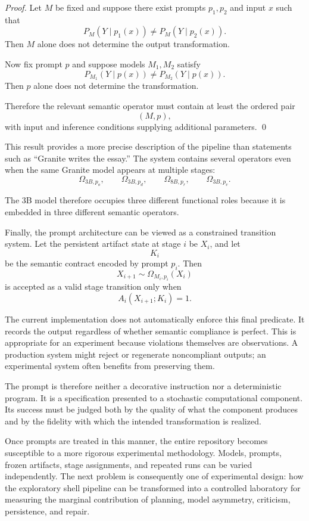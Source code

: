 \documentclass[11pt]{article}
\begin{document}
\begin{proof}
Let \(M\) be fixed and suppose there exist prompts \(p_1,p_2\) and input \(x\) such that
\[
    P_M(Y\mid p_1(x))
    \neq
    P_M(Y\mid p_2(x)).
\]
Then \(M\) alone does not determine the output transformation.

Now fix prompt \(p\) and suppose models \(M_1,M_2\) satisfy
\[
    P_{M_1}(Y\mid p(x))
    \neq
    P_{M_2}(Y\mid p(x)).
\]
Then \(p\) alone does not determine the transformation.

Therefore the relevant semantic operator must contain at least the ordered pair
\[
    (M,p),
\]
with input and inference conditions supplying additional parameters. \qed
\end{proof}

This result provides a more precise description of the pipeline than statements such as ``Granite writes the essay.'' The system contains several operators even when the same Granite model appears at multiple stages:
\[
    \Omega_{3B,p_o},
    \qquad
    \Omega_{3B,p_d},
    \qquad
    \Omega_{8B,p_r},
    \qquad
    \Omega_{3B,p_v}.
\]

The 3B model therefore occupies three different functional roles because it is embedded in three different semantic operators.

Finally, the prompt architecture can be viewed as a constrained transition system. Let the persistent artifact state at stage \(i\) be \(X_i\), and let
\[
    K_i
\]
be the semantic contract encoded by prompt \(p_i\). Then
\[
    X_{i+1}
    \sim
    \Omega_{M_i,p_i}(X_i)
\]
is accepted as a valid stage transition only when
\[
    A_i(X_{i+1};K_i)=1.
\]

The current implementation does not automatically enforce this final predicate. It records the output regardless of whether semantic compliance is perfect. This is appropriate for an experiment because violations themselves are observations. A production system might reject or regenerate noncompliant outputs; an experimental system often benefits from preserving them.

The prompt is therefore neither a decorative instruction nor a deterministic program. It is a specification presented to a stochastic computational component. Its success must be judged both by the quality of what the component produces and by the fidelity with which the intended transformation is realized.

Once prompts are treated in this manner, the entire repository becomes susceptible to a more rigorous experimental methodology. Models, prompts, frozen artifacts, stage assignments, and repeated runs can be varied independently. The next problem is consequently one of experimental design: how the exploratory shell pipeline can be transformed into a controlled laboratory for measuring the marginal contribution of planning, model asymmetry, criticism, persistence, and repair.
\end{document}
